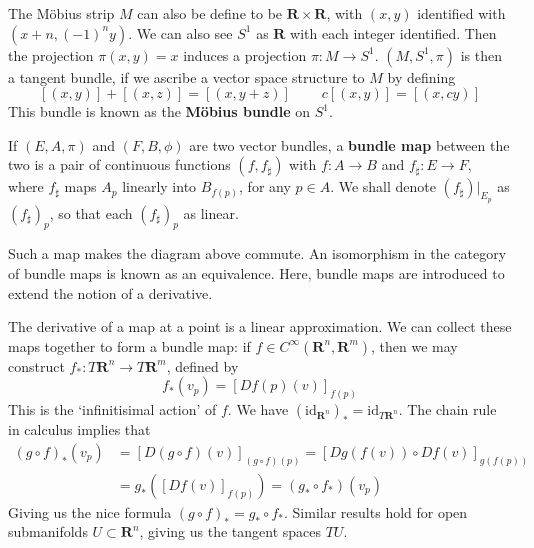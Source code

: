 \begin{example}
    The M\"{o}bius strip $M$ can also be define to be $\mathbf{R} \times \mathbf{R}$, with $(x,y)$ identified with $(x + n, (-1)^n y)$. We can also see $S^1$ as $\mathbf{R}$ with each integer identified. Then the projection $\pi(x,y) = x$ induces a projection $\pi: M \to S^1$. $(M, S^1, \pi)$ is then a tangent bundle, if we ascribe a vector space structure to $M$ by defining
    \[ [(x,y)] + [(x,z)] = [(x, y + z)]\ \ \ \ \ \ \ \ \ \ c[(x,y)] = [(x,cy)] \]
    This bundle is known as the {\bf M\"{o}bius bundle} on $S^1$.
\end{example}

If $(E,A,\pi)$ and $(F,B,\phi)$ are two vector bundles, a {\bf bundle map} between the two is a pair of continuous functions $(f,f_\sharp)$ with $f:A \to B$ and $f_\sharp:E \to F$, where $f_\sharp$ maps $A_p$ linearly into $B_{f(p)}$, for any $p \in A$. We shall denote $(f_\sharp)|_{E_p}$ as $(f_\sharp)_p$, so that each $(f_\sharp)_p$ as linear.
%
\begin{center}
\end{center}
%
Such a map makes the diagram above commute. An isomorphism in the category of bundle maps is known as an equivalence. Here, bundle maps are introduced to extend the notion of a derivative.

\begin{example}
    The derivative of a map at a point is a linear approximation. We can collect these maps together to form a bundle map: if $f \in C^\infty(\mathbf{R}^n, \mathbf{R}^m)$, then we may construct $f_*:T\mathbf{R}^n \to T\mathbf{R}^m$, defined by
    \[ f_*(v_p) = [Df(p)(v)]_{f(p)} \]
    This is the `infinitisimal action' of $f$. We have $(\text{id}_{\mathbf{R}^n})_* = \text{id}_{T\mathbf{R}^n}$. The chain rule in calculus implies that
    \begin{align*}
        (g \circ f)_*(v_p) &= [D(g \circ f)(v)]_{(g \circ f)(p)} = [Dg(f(v)) \circ Df(v)]_{g(f(p))}\\
        &= g_*([Df(v)]_{f(p)}) = (g_* \circ f_*)(v_p)
    \end{align*}
    Giving us the nice formula $(g \circ f)_* = g_* \circ f_*$. Similar results hold for open submanifolds $U \subset \mathbf{R}^n$, giving us the tangent spaces $TU$.
\end{example}

